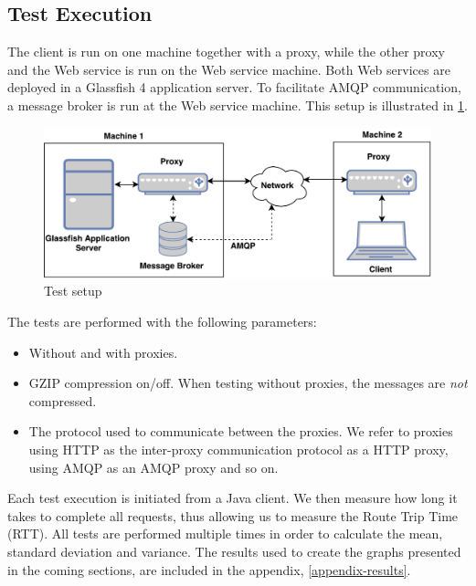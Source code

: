 \subsection{Test Execution}

The client is run on one machine together with a proxy, while the other proxy
and the Web service is run on the Web service machine. Both Web services are deployed
in a Glassfish 4 application server. To facilitate AMQP communication, a message
broker is run at the Web service machine. This setup is illustrated in
\cref{figure-testing-setup}.

\begin{figure}[h]
\includegraphics[width=\textwidth]{images/testing_setup.pdf}
\caption{Test setup}
\label{figure-testing-setup}
\end{figure}

The tests are performed with the following parameters:

\begin{itemize}

    \item Without and with proxies.

    \item GZIP compression on/off. When testing without proxies, the messages
    are \textit{not} compressed.

    \item The protocol used to communicate between the proxies. We refer to
    proxies using HTTP as the inter-proxy communication protocol as a HTTP
    proxy, using AMQP as an AMQP proxy and so on.

\end{itemize}

Each test execution is initiated from a Java client. We then measure how long it
takes to complete all requests, thus allowing us to measure the Route Trip Time
(RTT). All tests are performed multiple times in order to calculate the mean,
standard deviation and variance. The results used to create the graphs presented
in the coming sections, are included in the appendix, \cref{appendix-results}.


